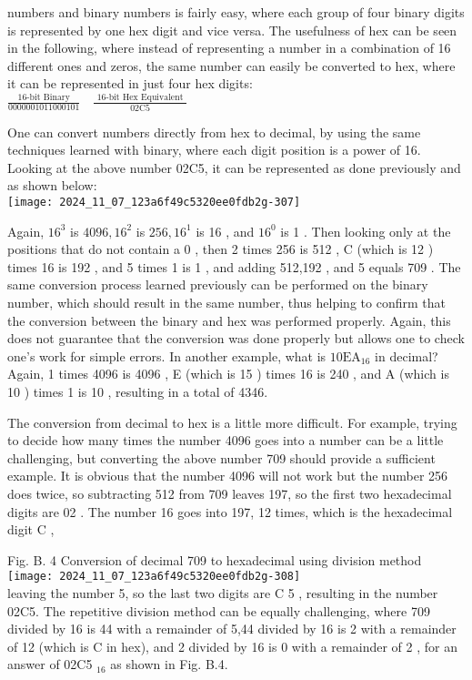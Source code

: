 \documentclass[10pt]{article}
\begin{document}
numbers and binary numbers is fairly easy, where each group of four binary digits is represented by one hex digit and vice versa. The usefulness of hex can be seen in the following, where instead of representing a number in a combination of 16 different ones and zeros, the same number can easily be converted to hex, where it can be represented in just four hex digits:\\
$\frac{\text { 16-bit Binary }}{0000001011000101} \quad \frac{\text { 16-bit Hex Equivalent }}{02 \mathrm{C} 5}$

One can convert numbers directly from hex to decimal, by using the same techniques learned with binary, where each digit position is a power of 16. Looking at the above number 02C5, it can be represented as done previously and as shown below:\\
\texttt{[image: 2024\_11\_07\_123a6f49c5320ee0fdb2g-307]}

Again, $16^{3}$ is $4096,16^{2}$ is $256,16^{1}$ is 16 , and $16^{0}$ is 1 . Then looking only at the positions that do not contain a 0 , then 2 times 256 is 512 , C (which is 12 ) times 16 is 192 , and 5 times 1 is 1 , and adding 512,192 , and 5 equals 709 . The same conversion process learned previously can be performed on the binary number, which should result in the same number, thus helping to confirm that the conversion between the binary and hex was performed properly. Again, this does not guarantee that the conversion was done properly but allows one to check one's work for simple errors. In another example, what is $10 \mathrm{EA}_{16}$ in decimal? Again, 1 times 4096 is 4096 , E (which is 15 ) times 16 is 240 , and A (which is 10 ) times 1 is 10 , resulting in a total of 4346.

The conversion from decimal to hex is a little more difficult. For example, trying to decide how many times the number 4096 goes into a number can be a little challenging, but converting the above number 709 should provide a sufficient example. It is obvious that the number 4096 will not work but the number 256 does twice, so subtracting 512 from 709 leaves 197, so the first two hexadecimal digits are 02 . The number 16 goes into 197, 12 times, which is the hexadecimal digit C ,

Fig. B. 4 Conversion of decimal 709 to hexadecimal using division method\\
\texttt{[image: 2024\_11\_07\_123a6f49c5320ee0fdb2g-308]}\\
leaving the number 5, so the last two digits are C 5 , resulting in the number 02C5. The repetitive division method can be equally challenging, where 709 divided by 16 is 44 with a remainder of 5,44 divided by 16 is 2 with a remainder of 12 (which is C in hex), and 2 divided by 16 is 0 with a remainder of 2 , for an answer of 02C5 ${ }_{16}$ as shown in Fig. B.4.
\end{document}
